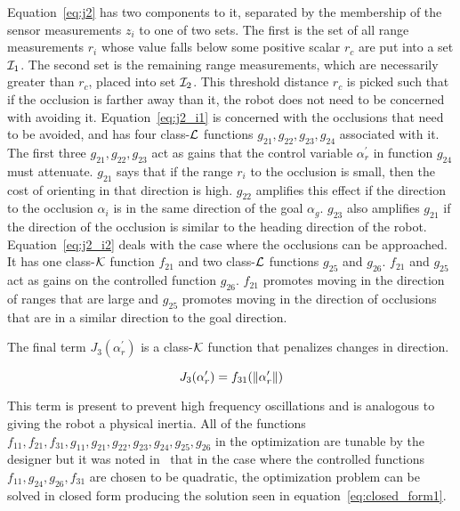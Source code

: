 Equation~\ref{eq:j2} has two components to it, separated by the membership of the sensor measurements $z_i$ to one of two sets. 
The first is the set of all range measurements $r_i$ whose value falls below some positive scalar $r_c$ are put into a set ${\cal I}_1$. 
The second set is the remaining range measurements, which are necessarily greater than $r_c$, placed into set ${\cal I}_2$. 
This threshold distance $r_c$ is picked such that if the occlusion is farther away than it, the robot does not need to be concerned with avoiding it.
Equation~\ref{eq:j2_i1} is concerned with the occlusions that need to be avoided, and has four class-$\cal L$ functions $g_{21}, g_{22}, g_{23}, g_{24}$ 
associated with it. The first three $g_{21}, g_{22}, g_{23}$ act as gains that the control variable $\alpha_r^\prime$ in function $g_{24}$ must attenuate.
$g_{21}$ says that if the range $r_i$ to the occlusion is small, then the cost of orienting in that direction is high.
$g_{22}$ amplifies this effect if the direction to the occlusion $\alpha_i$ is in the same direction of the goal $\alpha_g$.
$g_{23}$ also amplifies $g_{21}$ if the direction of the occlusion is similar to the heading direction of the robot.
Equation~\ref{eq:j2_i2} deals with the case where the occlusions can be approached. It has one class-${\cal K}$ function $f_{21}$ and two
class-${\cal L}$ functions $g_{25}$ and $g_{26}$. $f_{21}$ and $g_{25}$ act as gains on the controlled function $g_{26}$.
$f_{21}$ promotes moving in the direction of ranges that are large and $g_{25}$ promotes moving in the direction of occlusions
that are in a similar direction to the goal direction. 

The final term $J_3(\alpha_r^\prime)$ is a class-${\cal K}$ function that penalizes changes in direction.

\begin{equation}
	J_3(\alpha_r^\prime) = f_{31}(\left\lVert\alpha_r^\prime\right\rVert)
	\label{eq:j3}
\end{equation}

This term is present to prevent high frequency oscillations and is analogous to giving the robot a physical inertia.
All of the functions $f_{11}, f_{21}, f_{31}, g_{11}, g_{21}, g_{22}, g_{23}, g_{24}, g_{25}, g_{26}$ in the optimization are tunable by the designer but
it was noted in~\cite{Krishnamurthy07} that in the case where the controlled functions $f_{11}, g_{24}, g_{26}, f_{31}$ are 
chosen to be quadratic, the optimization problem can be solved in closed form producing the solution seen in equation~\ref{eq:closed_form1}.

